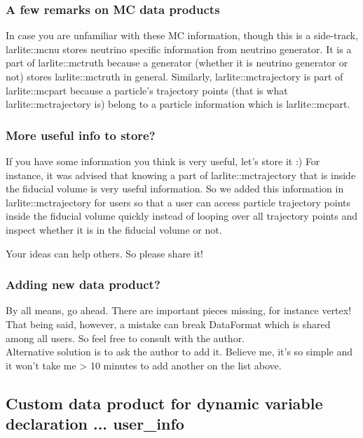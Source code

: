 \subsubsection{A few remarks on MC data products}
In case you are unfamiliar with these MC information, though this is a side-track, {\ttfamily larlite::mcnu} stores neutrino specific information from neutrino generator. It is a part of {\ttfamily larlite::mctruth} because a generator (whether it is neutrino generator or not) stores {\ttfamily larlite::mctruth} in general. Similarly, {\ttfamily larlite::mctrajectory} is part of {\ttfamily larlite::mcpart} because a particle's trajectory points (that is what {\ttfamily larlite::mctrajectory} is) belong to a particle information which is {\ttfamily larlite::mcpart}.

\subsubsection{More useful info to store?}
If you have some information you think is very useful, let's store it :)
For instance, it was advised that knowing a part of {\ttfamily larlite::mctrajectory} that is inside the fiducial volume is very useful information.
So we added this information in {\ttfamily larlite::mctrajectory} for users so that a user can access particle trajectory points inside the fiducial volume quickly instead of looping over all trajectory points and inspect whether it is in the fiducial volume or not.

Your ideas can help others. So please share it!

\subsubsection{Adding new data product?}
By all means, go ahead. There are important pieces missing, for instance vertex!
That being said, however, a mistake can break DataFormat which is shared among all users.
So feel free to consult with the author.\\

Alternative solution is to ask the author to add it. 
Believe me, it's so simple and it won't take me > 10 minutes to add another on the list above.

\subsection{Custom data product for dynamic variable declaration ... {\ttfamily user\_info}}

